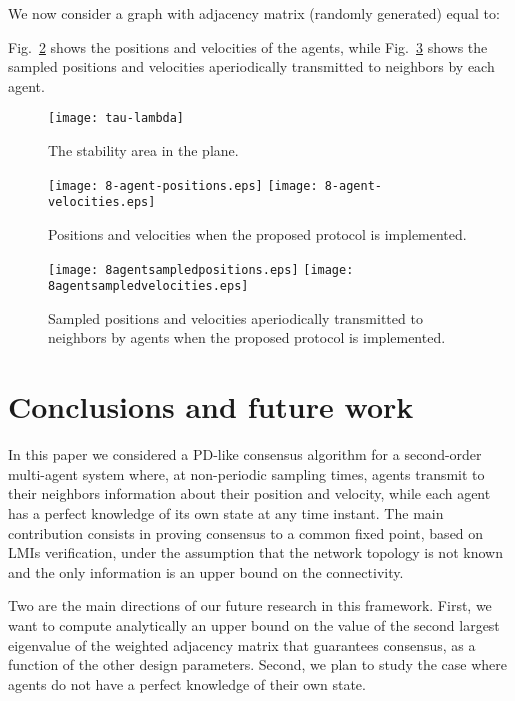 \documentclass[conference]{IEEEtran}
\begin{document}
We now consider a graph with adjacency matrix (randomly generated) equal to:


Fig.~\ref{fig:8-agent-positions} shows the positions and velocities of the agents, while Fig.~\ref{fig:8-agent-sampled velocities} shows the sampled positions and velocities aperiodically transmitted to neighbors by each agent.

\begin{figure}
\centering
\texttt{[image: tau-lambda]}
\caption{The stability area in the  plane.}
\label{fig:tau-lambda}
\end{figure}

\begin{figure}
\centering
\texttt{[image: 8-agent-positions.eps]}
\texttt{[image: 8-agent-velocities.eps]}
\caption{Positions and velocities when the proposed protocol is implemented.}
\label{fig:8-agent-positions}
\end{figure}

\begin{figure}
\centering
\texttt{[image: 8agentsampledpositions.eps]}
\texttt{[image: 8agentsampledvelocities.eps]}
\caption{Sampled positions and velocities aperiodically transmitted to neighbors by agents when the proposed protocol is implemented.}
\label{fig:8-agent-sampled velocities}
\end{figure}





\section{Conclusions and future work}\label{conclusions}


In this paper we considered a PD-like consensus algorithm for a second-order multi-agent system where, at non-periodic sampling times, agents transmit to their neighbors information about their position and velocity, while each agent has a perfect knowledge of its own state at any time instant.
The main contribution consists in proving consensus to a common fixed point, based on LMIs verification, under the assumption that the network topology is not known and the only information is an upper bound on the connectivity.

Two are the main directions of our future research in this framework.
First, we want to compute analytically an upper bound on the value of the second largest eigenvalue of the weighted adjacency matrix that guarantees consensus, as a function of the other design parameters. Second, we plan to study the case where agents do not have a perfect knowledge of their own state.






\end{document}
